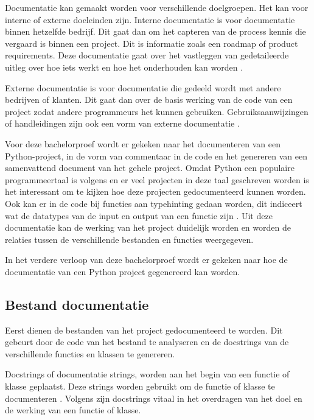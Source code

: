 Documentatie kan gemaakt worden voor verschillende doelgroepen. Het kan voor interne of externe doeleinden zijn.
Interne documentatie is voor documentatie binnen hetzelfde bedrijf.
Dit gaat dan om het capteren van de process kennis die vergaard is binnen een project. Dit is informatie zoals een roadmap of product requirements. 
Deze documentatie gaat over het vastleggen van gedetaileerde uitleg over hoe iets werkt en hoe het onderhouden kan worden \autocite{swimm.io2024}.

Externe documentatie is voor documentatie die gedeeld wordt met andere bedrijven of klanten. 
Dit gaat dan over de basis werking van de code van een project zodat andere programmeurs het kunnen gebruiken.
Gebruiksaanwijzingen of handleidingen zijn ook een vorm van externe documentatie \autocite{swimm.io2024}.

Voor deze bachelorproef wordt er gekeken naar het documenteren van een Python-project, in de vorm van commentaar in de code en het genereren van een samenvattend document van het gehele project.
Omdat Python een populaire programmeertaal is volgens \textcite{TIOBE2024} en er veel projecten in deze taal geschreven worden is het interessant om te kijken hoe deze projecten gedocumenteerd kunnen worden.
Ook kan er in de code bij functies aan typehinting gedaan worden, dit indiceert wat de datatypes van de input en output van een functie zijn \autocite{Bailey2024}.
Uit deze documentatie kan de werking van het project duidelijk worden en worden de relaties tussen de verschillende bestanden en functies weergegeven.

In het verdere verloop van deze bachelorproef wordt er gekeken naar hoe de documentatie van een Python project gegenereerd kan worden.

\subsection{Bestand documentatie}
\label{sec:bestand-documentatie}
Eerst dienen de bestanden van het project gedocumenteerd te worden.
Dit gebeurt door de code van het bestand te analyseren en de docstrings van de verschillende functies en klassen te genereren.

Docstrings of documentatie strings, worden aan het begin van een functie of klasse geplaatst.
Deze strings worden gebruikt om de functie of klasse te documenteren \autocite{GeeksforGeeks2023}.
Volgens \textcite{GeeksforGeeks2023} zijn docstrings vitaal in het overdragen van het doel en de werking van een functie of klasse.

